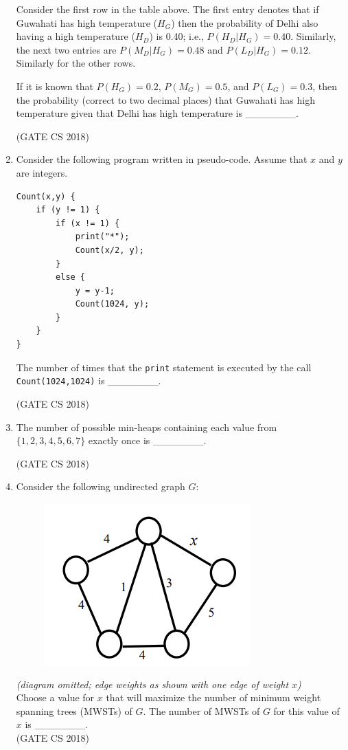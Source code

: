 \documentclass[12pt]{article}
\begin{document}
\begin{enumerate}
Consider the first row in the table above. The first entry denotes that if Guwahati has high
temperature ($H_G$) then the probability of Delhi also having a high temperature ($H_D$) is 0.40;
i.e., $P(H_D|H_G)=0.40$. Similarly, the next two entries are $P(M_D|H_G)=0.48$ and
$P(L_D|H_G)=0.12$. Similarly for the other rows.

If it is known that $P(H_G)=0.2$, $P(M_G)=0.5$, and $P(L_G)=0.3$, then the probability
(correct to two decimal places) that Guwahati has high temperature given that Delhi has high
temperature is \_\_\_\_\_\_\_.

(GATE CS 2018)

\item Consider the following program written in pseudo-code. Assume that $x$ and $y$ are integers.

\begin{verbatim}
Count(x,y) {
    if (y != 1) {
        if (x != 1) {
            print("*");
            Count(x/2, y);
        }
        else {
            y = y-1;
            Count(1024, y);
        }
    }
}
\end{verbatim}

The number of times that the \texttt{print} statement is executed by the call
\texttt{Count(1024,1024)} is \_\_\_\_\_\_\_.

(GATE CS 2018)

\item The number of possible min-heaps containing each value from
$\{1,2,3,4,5,6,7\}$ exactly once is \_\_\_\_\_\_\_.

(GATE CS 2018)

\item Consider the following undirected graph $G$:

\begin{figure}[H]
    \centering
    \includegraphics[width=0.5\columnwidth]{figs/ass6_a_q47.png}
    \caption{}
    \label{fig:placeholder}
\end{figure}
\textit{(diagram omitted; edge weights as shown with one edge of weight $x$)}\\[2pt]
Choose a value for $x$ that will maximize the number of minimum weight spanning trees (MWSTs) of $G$. The number of MWSTs of $G$ for this value of $x$ is \_\_\_\_\_\_\_.\\
(GATE CS 2018)


\end{enumerate}
\end{document}
